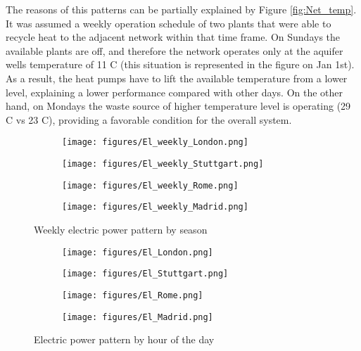 \documentclass{article}
\begin{document}
The reasons of this patterns can be partially explained by Figure \ref{fig:Net_temp}. It was assumed a weekly operation schedule of two plants that were able to recycle heat to the adjacent network within that time frame. On Sundays the available plants are off, and therefore the network operates only at the aquifer wells temperature of 11 \degree C (this situation is represented in the figure on Jan 1st). As a result, the heat pumps have to lift the available temperature from a lower level, explaining a lower performance compared with other days. On the other hand, on Mondays the waste source of higher temperature level is operating (29 \degree C vs 23 \degree C), providing a favorable condition for the overall system.


\begin{figure}[h]
\begin{subfigure}{0.5\textwidth}
\texttt{[image: figures/El\_weekly\_London.png]}
\end{subfigure}
\begin{subfigure}{0.5\textwidth}
\texttt{[image: figures/El\_weekly\_Stuttgart.png]}
\end{subfigure}

\begin{subfigure}{0.5\textwidth}
\texttt{[image: figures/El\_weekly\_Rome.png]}
\end{subfigure}
\begin{subfigure}{0.5\textwidth}
\texttt{[image: figures/El\_weekly\_Madrid.png]}
\end{subfigure}
\caption{Weekly electric power pattern by season}
\label{fig:weekly_electric}
\end{figure}

\begin{figure}[h]
\begin{subfigure}{0.5\textwidth}
\texttt{[image: figures/El\_London.png]}
\end{subfigure}
\begin{subfigure}{0.5\textwidth}
\texttt{[image: figures/El\_Stuttgart.png]}
\end{subfigure}

\begin{subfigure}{0.5\textwidth}
\texttt{[image: figures/El\_Rome.png]}
\end{subfigure}
\begin{subfigure}{0.5\textwidth}
\texttt{[image: figures/El\_Madrid.png]}
\end{subfigure}

\caption{Electric power pattern by hour of the day}
\label{fig:hourly_electric}
\end{figure}
\end{document}
